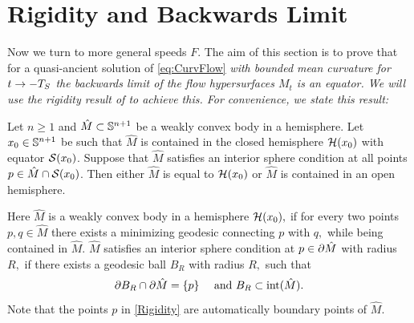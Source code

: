 \documentclass{amsart}
\begin{document}
\section{Rigidity and Backwards Limit}\label{sec:rigidity}
Now we turn to more general speeds \(F\). The aim of this section is to prove that for a quasi-ancient solution of \eqref{eq:CurvFlow} \it{with bounded mean curvature} for $t\ra -T_S$ the backwards limit of the flow hypersurfaces $M_t$  is an equator. We will use the rigidity result of \cite{MakowskiScheuer:/2013} to achieve this. For convenience, we state this result:
\begin{thm}\label{Rigidity}\textsc{\cite[Theorem 1.1]{MakowskiScheuer:/2013}}
Let $ n\geq 1$ and $\hat{M}\subset \S^{n+1}$ be a weakly convex body in a hemisphere. Let $x_0\in \S^{n+1}$ be such that $\hat{M}$ is contained in the closed hemisphere $\mc{H}(x_0)$ with equator $\mc{S}(x_{0})$. Suppose that $\hat{M}$ satisfies an interior sphere condition at all points $p\in \hat{M} \cap \mc{S}(x_0)$. Then either $\hat{M}$ is equal to $\mc{H}(x_0)$ or $\hat{M}$ is contained in an open hemisphere.
\end{thm}
Here $\hat{M}$ is a weakly convex body in a hemisphere $\mc{H}(x_0),$ if for every two points $p,q\in\hat{M}$ there exists a minimizing geodesic connecting $p$ with $q,$ while being contained in $\hat{M}.$ $\hat{M}$ satisfies an interior sphere condition at $p\in \del\hat{M}$ with radius $R,$ if there exists a geodesic ball $B_R$ with radius $R,$ such that
\[\del B_R\cap\del \hat{M}=\{p\}\quad~\text{and}~B_R\sub\mrm{int}(\hat{M}). \]
Note that the points $p$ in \cref{Rigidity} are automatically boundary points of $\hat{M}.$
\end{document}
